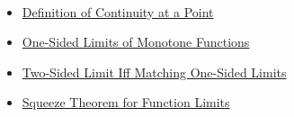 \begin{remark*}[Dependencies]~\\
\begin{itemize}
  \item \hyperref[def:continuous-at-point]{Definition of Continuity at a Point}
  \item \hyperref[thm:monotone-one-sided-limits]{One-Sided Limits of Monotone Functions}
  \item \hyperref[thm:two-sided-limit-iff-matching-one-sided-limits]{Two-Sided Limit Iff Matching One-Sided Limits}
  \item \hyperref[thm:squeeze-function-limits]{Squeeze Theorem for Function Limits}
\end{itemize}
\end{remark*}
